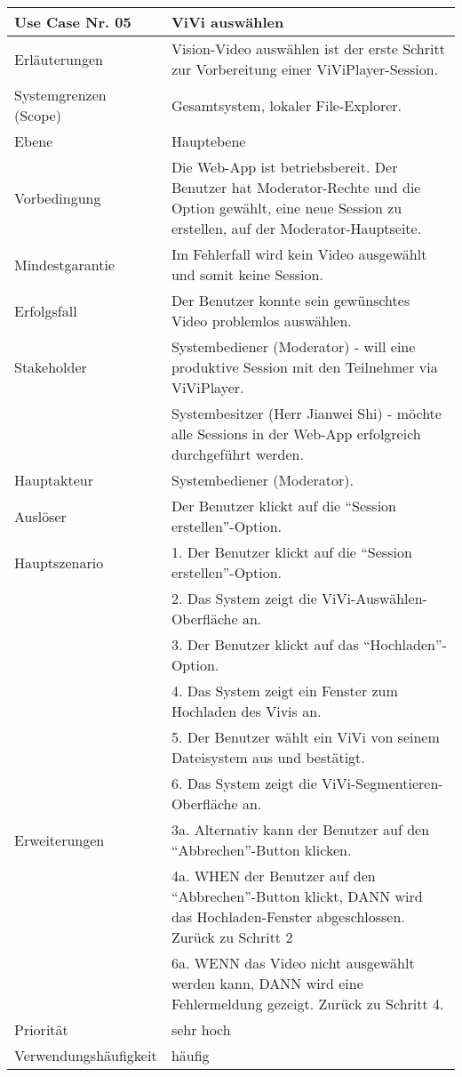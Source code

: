 \begin{tabularx}{\linewidth}{|l|X|}
	\hline
	Use Case Nr. 05			& \textbf{ViVi auswählen} \\ \hline
	Erläuterungen			& Vision-Video auswählen ist der erste Schritt zur Vorbereitung 
							  einer ViViPlayer-Session. \\ \hline
	Systemgrenzen (Scope)	& Gesamtsystem, lokaler File-Explorer. \\ \hline
	Ebene					& Hauptebene \\ \hline
	Vorbedingung			& Die Web-App ist betriebsbereit. Der Benutzer hat 
							  Moderator-Rechte und die Option gewählt, eine neue Session zu 
							  erstellen, auf der Moderator-Hauptseite. \\ \hline
	Mindestgarantie			& Im Fehlerfall wird kein Video ausgewählt und somit keine 
							  Session.\\ \hline
	Erfolgsfall 			& Der Benutzer konnte sein gewünschtes Video problemlos auswählen. 
							  \\ \hline
	Stakeholder				& Systembediener (Moderator) - will eine produktive Session mit den 
							  Teilnehmer via ViViPlayer. \\
							& Systembesitzer (Herr Jianwei Shi) - möchte alle Sessions in der 
							  Web-App erfolgreich durchgeführt werden. \\ \hline
	Hauptakteur				& Systembediener (Moderator). \\ \hline
	Auslöser				& Der Benutzer klickt auf die ``Session erstellen''-Option. \\ \hline	
	Hauptszenario			& 1. Der Benutzer klickt auf die ``Session erstellen''-Option. \\
							& 2. Das System zeigt die ViVi-Auswählen-Oberfläche an. \\
							& 3. Der Benutzer klickt auf das ``Hochladen''-Option. \\
							& 4. Das System zeigt ein Fenster zum Hochladen des Vivis an. \\
							& 5. Der Benutzer wählt ein ViVi von seinem Dateisystem aus und 
							  bestätigt. \\
							& 6. Das System zeigt die ViVi-Segmentieren-Oberfläche an. \\ \hline
	Erweiterungen			& 3a. Alternativ kann der Benutzer auf den ``Abbrechen''-Button klicken. \\
							& 4a. WHEN der Benutzer auf den ``Abbrechen''-Button klickt, DANN wird das 
							  Hochladen-Fenster abgeschlossen. Zurück zu Schritt 2  \\
							& 6a. WENN das Video nicht ausgewählt werden kann, DANN wird eine 
							  Fehlermeldung gezeigt. Zurück zu Schritt 4. \\ \hline
	Priorität				& sehr hoch \\ \hline
	Verwendungshäufigkeit	& häufig \\ \hline
\end{tabularx}